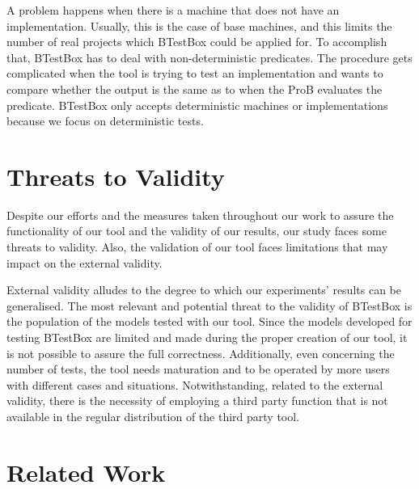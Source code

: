 \documentclass[runningheads]{llncs}
\begin{document}
A problem happens when there is a machine that does not have an implementation. Usually, this is the case of base machines, and this limits the number of real projects which BTestBox could be applied for. %
To accomplish that, BTestBox has to deal with non-deterministic predicates. The procedure gets complicated when the tool is trying to test an implementation and wants to compare whether the output is the same as to when the ProB evaluates the predicate. BTestBox only accepts deterministic machines or implementations because we focus on deterministic tests.

\section{Threats to Validity}

Despite our efforts and the measures taken throughout our work to assure the functionality of our tool and the validity of our results, our study faces some threats to validity. Also, the validation of our tool faces limitations that may impact on the external validity.

External validity alludes to the degree to which our experiments' results can be generalised. The most relevant and potential threat to the validity of BTestBox is the population of the models tested with our tool. Since the models developed for testing BTestBox are limited and made during the proper creation of our tool, it is not possible to assure the full correctness. Additionally, even concerning the number of tests, the tool needs maturation and to be operated by more users with different cases and situations. Notwithstanding, related to the external validity, there is the necessity of employing a third party function that is not available in the regular distribution of the third party tool.


\section{Related Work} \label{sec:RelatedWork}
\end{document}
